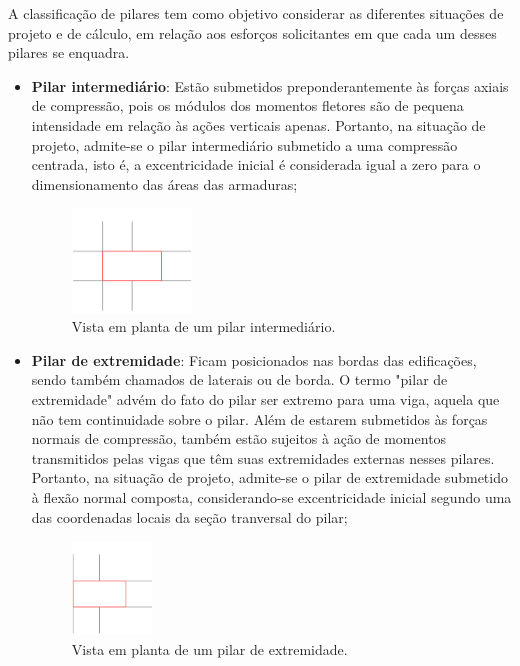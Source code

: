 A classificação de pilares tem como objetivo considerar as diferentes situações de projeto e de cálculo, em relação aos esforços solicitantes em que cada um desses pilares se enquadra.

\begin{itemize}
	\item \textbf{Pilar intermediário}: Estão submetidos preponderantemente às forças axiais de compressão, pois os módulos dos momentos fletores são de pequena intensidade em relação às ações verticais apenas. Portanto, na situação de projeto, admite-se o pilar intermediário submetido a uma compressão centrada, isto é, a excentricidade inicial é considerada igual a zero para o dimensionamento das áreas das armaduras;

	\begin{figure}[H]
		\begin{center}
		\caption{Vista em planta de um pilar intermediário.}
    		\includegraphics[width=0.3\textwidth]{Pilar-intermediario-de-extremidade-e-de-canto/Imagens/Pilar-intermediario.png}
		\end{center}
	\end{figure}

	\item \textbf{Pilar de extremidade}: Ficam posicionados nas bordas das edificações, sendo também chamados de laterais ou de borda. O termo "pilar de extremidade" advém do fato do pilar ser extremo para uma viga, aquela que não tem continuidade sobre o pilar. Além de estarem submetidos às forças normais de compressão, também estão sujeitos à ação de momentos transmitidos pelas vigas que têm suas extremidades externas nesses pilares. Portanto, na situação de projeto, admite-se o pilar de extremidade submetido à flexão normal composta, considerando-se excentricidade inicial segundo uma das coordenadas locais da seção tranversal do pilar;

	\begin{figure}[H]
		\begin{center}
		\caption{Vista em planta de um pilar de extremidade.}
    		\includegraphics[width=0.2\textwidth]{Pilar-intermediario-de-extremidade-e-de-canto/Imagens/Pilar-de-extremidade.png}
		\end{center}
	\end{figure}


\end{itemize}
